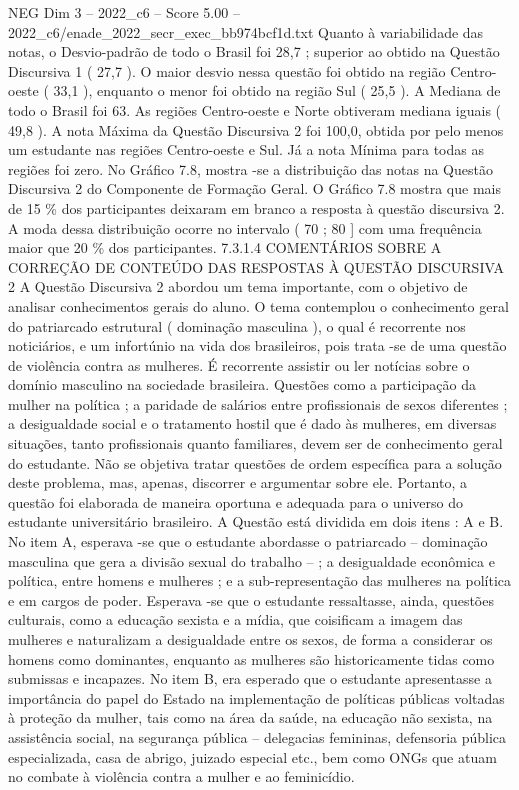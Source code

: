 \begin{textsample}{NEG Dim 3 – 2022\_c6 – Score 5.00 – 2022\_c6/enade\_2022\_secr\_exec\_bb974bcf1d.txt}
Quanto à variabilidade das notas, o Desvio-padrão de todo o Brasil foi 28,7 ; superior ao obtido na Questão Discursiva 1 ( 27,7 ).
O maior desvio nessa questão foi obtido na região Centro-oeste ( 33,1 ), enquanto o menor foi obtido na região Sul ( 25,5 ).
A Mediana de todo o Brasil foi 63.
As regiões Centro-oeste e Norte obtiveram mediana iguais ( 49,8 ).
A nota Máxima da Questão Discursiva 2 foi 100,0, obtida por pelo menos um estudante nas regiões Centro-oeste e Sul.
Já a nota Mínima para todas as regiões foi zero.
No Gráfico 7.8, mostra -se a distribuição das notas na Questão Discursiva 2 do Componente de Formação Geral.
O Gráfico 7.8 mostra que mais de 15 \% dos participantes deixaram em branco a resposta à questão discursiva 2.
A moda dessa distribuição ocorre no intervalo ( 70 ; 80 ] com uma frequência maior que 20 \% dos participantes. 7.3.1.4 COMENTÁRIOS SOBRE A CORREÇÃO DE CONTEÚDO DAS RESPOSTAS À QUESTÃO DISCURSIVA 2 A Questão Discursiva 2 abordou um tema importante, com o objetivo de analisar conhecimentos gerais do aluno.
O tema contemplou o conhecimento geral do patriarcado estrutural ( dominação masculina ), o qual é recorrente nos noticiários, e um infortúnio na vida dos brasileiros, pois trata -se de uma questão de violência contra as mulheres.
É recorrente assistir ou ler notícias sobre o domínio masculino na sociedade brasileira.
Questões como a participação da mulher na política ; a paridade de salários entre profissionais de sexos diferentes ; a desigualdade social e o tratamento hostil que é dado às mulheres, em diversas situações, tanto profissionais quanto familiares, devem ser de conhecimento geral do estudante.
Não se objetiva tratar questões de ordem específica para a solução deste problema, mas, apenas, discorrer e argumentar sobre ele.
Portanto, a questão foi elaborada de maneira oportuna e adequada para o universo do estudante universitário brasileiro.
A Questão está dividida em dois itens : A e B.
No item A, esperava -se que o estudante abordasse o patriarcado – dominação masculina que gera a divisão sexual do trabalho – ; a desigualdade econômica e política, entre homens e mulheres ; e a sub-representação das mulheres na política e em cargos de poder.
Esperava -se que o estudante ressaltasse, ainda, questões culturais, como a educação sexista e a mídia, que coisificam a imagem das mulheres e naturalizam a desigualdade entre os sexos, de forma a considerar os homens como dominantes, enquanto as mulheres são historicamente tidas como submissas e incapazes.
No item B, era esperado que o estudante apresentasse a importância do papel do Estado na implementação de políticas públicas voltadas à proteção da mulher, tais como na área da saúde, na educação não sexista, na assistência social, na segurança pública – delegacias femininas, defensoria pública especializada, casa de abrigo, juizado especial etc., bem como ONGs que atuam no combate à violência contra a mulher e ao feminicídio.

\end{textsample}
